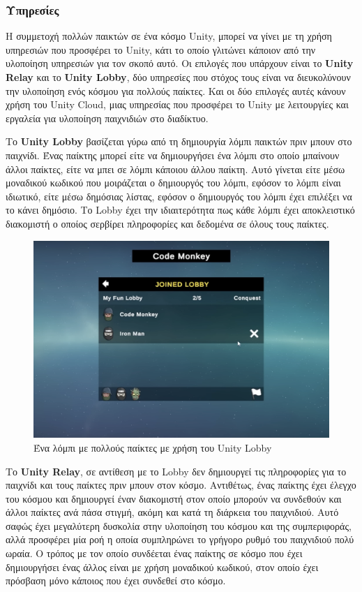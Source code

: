 
\subsubsection{Υπηρεσίες}

Η συμμετοχή πολλών παικτών σε ένα κόσμο Unity, μπορεί να γίνει με τη χρήση υπηρεσιών που προσφέρει το Unity, κάτι το οποίο γλιτώνει κάποιον από την υλοποίηση υπηρεσιών για τον σκοπό αυτό. Οι επιλογές που υπάρχουν είναι το \textbf{Unity Relay} και το \textbf{Unity Lobby}, δύο υπηρεσίες που στόχος τους είναι να διευκολύνουν την υλοποίηση ενός κόσμου για πολλούς παίκτες. Και οι δύο επιλογές αυτές κάνουν χρήση του Unity Cloud, μιας υπηρεσίας που προσφέρει το Unity με λειτουργίες και εργαλεία για υλοποίηση παιχνιδιών στο διαδίκτυο.

Το \textbf{Unity Lobby} βασίζεται γύρω από τη δημιουργία λόμπι παικτών πριν μπουν στο παιχνίδι. Ένας παίκτης μπορεί είτε να δημιουργήσει ένα λόμπι στο οποίο μπαίνουν άλλοι παίκτες, είτε να μπει σε λόμπι κάποιου άλλου παίκτη. Αυτό γίνεται είτε μέσω μοναδικού κωδικού που μοιράζεται ο δημιουργός του λόμπι, εφόσον το λόμπι είναι ιδιωτικό, είτε μέσω δημόσιας λίστας, εφόσον ο δημιουργός του λόμπι έχει επιλέξει να το κάνει δημόσιο. Το Lobby έχει την ιδιαιτερότητα πως κάθε λόμπι έχει αποκλειστικό διακομιστή ο οποίος σερβίρει πληροφορίες και δεδομένα σε όλους τους παίκτες\cite{code_monkey_making_2022}.

\begin{figure}[H]
    \centering
    \includegraphics[width=0.8\linewidth]{sections/4/4/images/unity_lobby}
    \caption{Ένα λόμπι με πολλούς παίκτες με χρήση του Unity Lobby}
    \label{fig:unity_lobby}
\end{figure}

Το \textbf{Unity Relay}, σε αντίθεση με το Lobby δεν δημιουργεί τις πληροφορίες για το παιχνίδι και τους παίκτες πριν μπουν στον κόσμο. Αντιθέτως, ένας παίκτης έχει έλεγχο του κόσμου και δημιουργεί έναν διακομιστή στον οποίο μπορούν να συνδεθούν και άλλοι παίκτες ανά πάσα στιγμή, ακόμη και κατά τη διάρκεια του παιχνιδιού. Αυτό σαφώς έχει μεγαλύτερη δυσκολία στην υλοποίηση του κόσμου και της συμπεριφοράς, αλλά προσφέρει μία ροή η οποία συμπληρώνει το γρήγορο ρυθμό του παιχνιδιού πολύ ωραία. Ο τρόπος με τον οποίο συνδέεται ένας παίκτης σε κόσμο που έχει δημιουργήσει ένας άλλος είναι με χρήση μοναδικού κωδικού, στον οποίο έχει πρόσβαση μόνο κάποιος που έχει συνδεθεί στο κόσμο.

